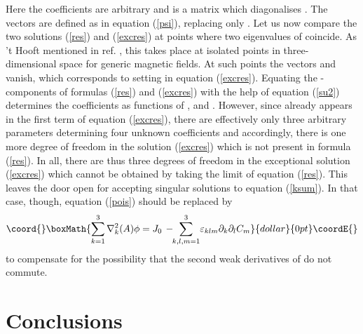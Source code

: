 \documentclass[a4paper,12pt]{article}
\begin{document}
Here the coefficients \coordHE{} are arbitrary and \myHighlight{$\Omega$}\coordHE{} is a matrix which diagonalises \coordHE{}. The vectors \coordHE{} are defined as in equation (\ref{psi}), replacing only \coordHE{}. Let us now compare the two solutions (\ref{res}) and (\ref{excres}) at points where two eigenvalues of \coordHE{} coincide. As 't Hooft mentioned in ref. \cite{th}, this takes place at isolated points in three-dimensional space for generic magnetic fields. At such points the vectors \coordHE{} and \coordHE{} vanish, which corresponds to setting \coordHE{} in equation (\ref{excres}). Equating the \coordHE{}-components of formulas (\ref{res}) and (\ref{excres}) with the help of equation (\ref{su2}) determines the coefficients \coordHE{} as functions of \coordHE{}, \coordHE{} and \coordHE{}. However, since \coordHE{} already appears in the first term of equation (\ref{excres}), there are effectively only three arbitrary parameters determining four unknown coefficients and accordingly, there is one more degree of freedom in the solution (\ref{excres}) which is not present in formula (\ref{res}). In all, there are thus three degrees of freedom in the exceptional solution (\ref{excres}) which cannot be obtained by taking the limit of equation (\ref{res}). This leaves the door open for accepting singular solutions to equation (\ref{ksum}). In that case, though, equation (\ref{pois}) should be replaced by
$$\coord{}\boxMath{ \sum_{k=1}^3 \nabla_k^2(A) \phi = J_0 \, - \!\! \sum_{k,l,m=1}^3 \! \varepsilon_{klm} \partial_k \partial_l C_m }{dollar}{0pt}\coordE{}$$
to compensate for the possibility that the second weak derivatives of \coordHE{} do not commute.
 
\section{Conclusions}
\end{document}
